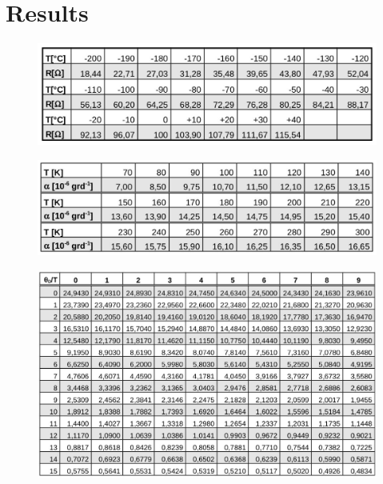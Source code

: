\section{Results}
\label{sec:results}

\begin{figure}[H]
	\centering
	\includegraphics[width=0.6\linewidth]{content/graphics/resistance.jpg}
	\caption{\cite{molar_heat}}
	\label{fig:resistance}
\end{figure}

\begin{figure}[H]
	\centering
	\includegraphics[width=0.6\linewidth]{content/graphics/expansion.jpg}
	\caption{\cite{molar_heat}}
	\label{fig:expansion}
\end{figure}

\begin{figure}[H]
	\centering
	\includegraphics[width=0.8\linewidth]{content/graphics/ratio.jpg}
	\caption{\cite{molar_heat}}
	\label{fig:ratio}
\end{figure}

